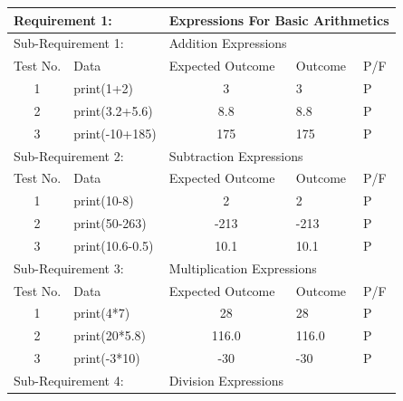 \documentclass[a4paper, oneside, 11pt]{report}
\begin{document}
\begin{table}
\label{tab:req1}
\begin{tabular}{clcll}
\hline
\multicolumn{2}{l}{Requirement 1:}             & \multicolumn{3}{l}{Expressions For Basic Arithmetics} \\ \hline
\multicolumn{2}{l}{Sub-Requirement 1:}         & \multicolumn{3}{l}{Addition Expressions}              \\
\multicolumn{1}{l}{Test No.} & Data            & \multicolumn{1}{l}{Expected Outcome}  & Outcome & P/F \\
1                            & print(1+2)      & 3                                     &    3     & P    \\
2                            & print(3.2+5.6)  & 8.8                                  &     8.8    & P    \\
3                            & print(-10+185)  & 175                                   &    175     & P    \\
\multicolumn{2}{l}{Sub-Requirement 2:}         & \multicolumn{3}{l}{Subtraction Expressions}           \\
\multicolumn{1}{l}{Test No.} & Data            & \multicolumn{1}{l}{Expected Outcome}  & Outcome & P/F \\
1                            & print(10-8)     & 2                                     &    2     &  P   \\
2                            & print(50-263)   & -213                                  &    -213     &P     \\
3                            & print(10.6-0.5) & 10.1                                  &    10.1     & P    \\
\multicolumn{2}{l}{Sub-Requirement 3:}         & \multicolumn{3}{l}{Multiplication Expressions}        \\
\multicolumn{1}{l}{Test No.} & Data            & \multicolumn{1}{l}{Expected Outcome}  & Outcome & P/F \\
1                            & print(4*7)      & 28                                    &    28     &    P \\
2                            & print(20*5.8)   & 116.0                                   &    116.0     &P     \\
3                            & print(-3*10)    & -30                                   &    -30     & P    \\
\multicolumn{2}{l}{Sub-Requirement 4:}         & \multicolumn{3}{l}{Division Expressions}        \\

\end{tabular}
\end{table}
\end{document}
